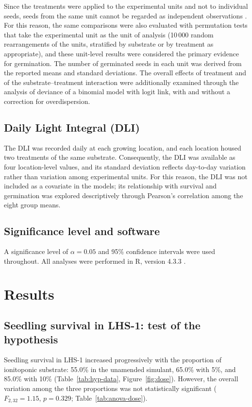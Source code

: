 \documentclass[11pt]{article}
\begin{document}
Since the treatments were applied to the experimental units and not to individual seeds, seeds from the same unit cannot be regarded as independent observations \citep{hurlbert}. For this reason, the same comparisons were also evaluated with permutation tests that take the experimental unit as the unit of analysis (10\,000 random rearrangements of the units, stratified by substrate or by treatment as appropriate), and these unit-level results were considered the primary evidence for germination. The number of germinated seeds in each unit was derived from the reported means and standard deviations. The overall effects of treatment and of the substrate--treatment interaction were additionally examined through the analysis of deviance of a binomial model with logit link, with and without a correction for overdispersion.

\subsection{Daily Light Integral (DLI)}

The DLI was recorded daily at each growing location, and each location housed two treatments of the same substrate. Consequently, the DLI was available as four location-level values, and its standard deviation reflects day-to-day variation rather than variation among experimental units. For this reason, the DLI was not included as a covariate in the models; its relationship with survival and germination was explored descriptively through Pearson's correlation among the eight group means.

\subsection{Significance level and software}

A significance level of $\alpha = 0.05$ and 95\% confidence intervals were used throughout. All analyses were performed in R, version 4.3.3 \citep{rcore}.

\section{Results}

\subsection{Seedling survival in LHS-1: test of the hypothesis}

Seedling survival in LHS-1 increased progressively with the proportion of ionitoponic substrate: 55.0\% in the unamended simulant, 65.0\% with 5\%, and 85.0\% with 10\% (Table~\ref{tab:hyp-data}, Figure~\ref{fig:dose}). However, the overall variation among the three proportions was not statistically significant ($F_{2,32} = 1.15$, $p = 0.329$; Table~\ref{tab:anova-dose}).
\end{document}
